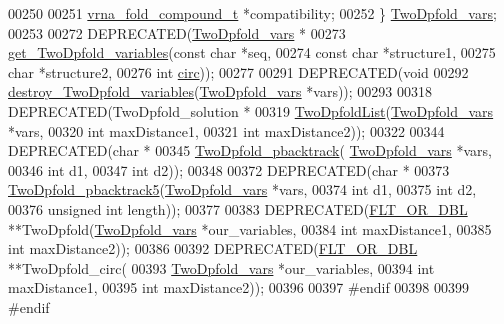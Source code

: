 \begin{DoxyCode}
00250 
00251   \hyperlink{group__fold__compound_structvrna__fc__s}{vrna\_fold\_compound\_t} *compatibility;
00252 \} \hyperlink{structTwoDpfold__vars}{TwoDpfold\_vars};
00253 
00272 DEPRECATED(\hyperlink{structTwoDpfold__vars}{TwoDpfold\_vars}  *
00273 \hyperlink{2Dpfold_8h_a1aca740e2a75ab2b2951538266e53d64}{get\_TwoDpfold\_variables}(\textcolor{keyword}{const} \textcolor{keywordtype}{char} *seq,
00274                         \textcolor{keyword}{const} \textcolor{keywordtype}{char} *structure1,
00275                         \textcolor{keywordtype}{char} *structure2,
00276                         \textcolor{keywordtype}{int} \hyperlink{group__model__details_gaf9202a1a09f5828dc731e2d9a10fa111}{circ}));
00277 
00291 DEPRECATED(\textcolor{keywordtype}{void} 
00292 \hyperlink{2Dpfold_8h_afe994291458ee2ac34d3eb825ef62a15}{destroy\_TwoDpfold\_variables}(\hyperlink{structTwoDpfold__vars}{TwoDpfold\_vars} *vars));
00293 
00318 DEPRECATED(TwoDpfold\_solution  *
00319 \hyperlink{2Dpfold_8h_a692243dac482a1e158a8e1b7881cfda2}{TwoDpfoldList}(\hyperlink{structTwoDpfold__vars}{TwoDpfold\_vars} *vars,
00320               \textcolor{keywordtype}{int} maxDistance1,
00321               \textcolor{keywordtype}{int} maxDistance2));
00322 
00344 DEPRECATED(\textcolor{keywordtype}{char} *
00345 \hyperlink{2Dpfold_8h_ae251288f50dd4ae7d315af0085775f71}{TwoDpfold\_pbacktrack}( \hyperlink{structTwoDpfold__vars}{TwoDpfold\_vars} *vars,
00346                       \textcolor{keywordtype}{int} d1,
00347                       \textcolor{keywordtype}{int} d2));
00348 
00372 DEPRECATED(\textcolor{keywordtype}{char} *
00373 \hyperlink{2Dpfold_8h_a13430ac6a7f90df426774f131647d2c7}{TwoDpfold\_pbacktrack5}(\hyperlink{structTwoDpfold__vars}{TwoDpfold\_vars} *vars,
00374                       \textcolor{keywordtype}{int} d1,
00375                       \textcolor{keywordtype}{int} d2,
00376                       \textcolor{keywordtype}{unsigned} \textcolor{keywordtype}{int} length));
00377 
00383 DEPRECATED(\hyperlink{group__data__structures_ga31125aeace516926bf7f251f759b6126}{FLT\_OR\_DBL}          **TwoDpfold(\hyperlink{structTwoDpfold__vars}{TwoDpfold\_vars} *our\_variables,
00384                                 \textcolor{keywordtype}{int} maxDistance1,
00385                                 \textcolor{keywordtype}{int} maxDistance2));
00386 
00392 DEPRECATED(\hyperlink{group__data__structures_ga31125aeace516926bf7f251f759b6126}{FLT\_OR\_DBL}          **TwoDpfold\_circ(
00393                                 \hyperlink{structTwoDpfold__vars}{TwoDpfold\_vars} *our\_variables,
00394                                 \textcolor{keywordtype}{int} maxDistance1,
00395                                 \textcolor{keywordtype}{int} maxDistance2));
00396 
00397 \textcolor{preprocessor}{#endif}
00398 
00399 \textcolor{preprocessor}{#endif}
\end{DoxyCode}
